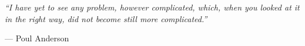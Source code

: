 

\begingroup

\let\clearpage\relax
\let\cleardoublepage\relax
\let\cleardoublepage\relax

\vfill




\vspace{1em}

    \centering
    \vspace*{\fill}

    {\large\itshape
    ``I have yet to see any problem, however complicated, which, when you looked at it in the right way, did not become still more complicated.''\par}

    \vspace{2em}
    {\normalsize --- Poul Anderson\par}

    \vspace*{\fill}
\vfill

\endgroup

